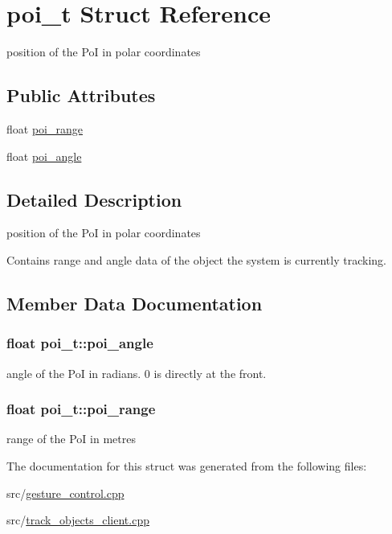 \hypertarget{structpoi__t}{}\section{poi\+\_\+t Struct Reference}
\label{structpoi__t}


position of the PoI in polar coordinates  


\subsection*{Public Attributes}
\begin{DoxyCompactItemize}
\item 
float \hyperlink{structpoi__t_ae5f9ca22bbe2f78476ad6d08bc31a231}{poi\+\_\+range}
\item 
float \hyperlink{structpoi__t_a59b58f432e793217c33691e9c8b921b7}{poi\+\_\+angle}
\end{DoxyCompactItemize}


\subsection{Detailed Description}
position of the PoI in polar coordinates 

Contains range and angle data of the object the system is currently tracking. 

\subsection{Member Data Documentation}
\subsubsection[{\texorpdfstring{poi\+\_\+angle}{poi_angle}}]{\setlength{\rightskip}{0pt plus 5cm}float poi\+\_\+t\+::poi\+\_\+angle}\hypertarget{structpoi__t_a59b58f432e793217c33691e9c8b921b7}{}\label{structpoi__t_a59b58f432e793217c33691e9c8b921b7}
angle of the PoI in radians. 0 is directly at the front. 
\subsubsection[{\texorpdfstring{poi\+\_\+range}{poi_range}}]{\setlength{\rightskip}{0pt plus 5cm}float poi\+\_\+t\+::poi\+\_\+range}\hypertarget{structpoi__t_ae5f9ca22bbe2f78476ad6d08bc31a231}{}\label{structpoi__t_ae5f9ca22bbe2f78476ad6d08bc31a231}
range of the PoI in metres 

The documentation for this struct was generated from the following files\+:\begin{DoxyCompactItemize}
\item 
src/\hyperlink{gesture__control_8cpp}{gesture\+\_\+control.\+cpp}\item 
src/\hyperlink{track__objects__client_8cpp}{track\+\_\+objects\+\_\+client.\+cpp}\end{DoxyCompactItemize}
